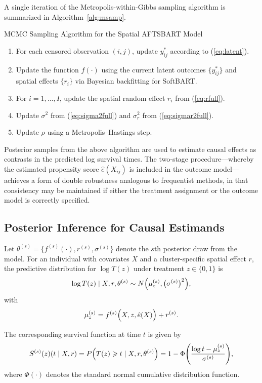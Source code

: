 \documentclass[useAMS,referee]{biom}
\begin{document}
A single iteration of the Metropolis-within-Gibbs sampling algorithm is summarized in Algorithm~\ref{alg:msamp}.

\begin{algorithm}[H]
\caption{MCMC Sampling Algorithm for the Spatial AFTSBART Model}\label{alg:msamp}
\begin{enumerate}
    \item For each censored observation \((i,j)\), update \(y_{ij}^\ast\) according to (\ref{eq:latent}).
    \item Update the function \(f(\cdot)\) using the current latent outcomes \(\{y_{ij}^\ast\}\) and spatial effects \(\{r_i\}\) via Bayesian backfitting for SoftBART.
    \item For \(i=1,\ldots,I\), update the spatial random effect \(r_i\) from (\ref{eq:rfull}).
    \item Update \(\sigma^2\) from (\ref{eq:sigma2full}) and \(\sigma_r^2\) from (\ref{eq:sigmar2full}).
    \item Update \(\rho\) using a Metropolis--Hastings step.
\end{enumerate}
\end{algorithm}

Posterior samples from the above algorithm are used to estimate causal effects as contrasts in the predicted log survival times. The two-stage procedure—whereby the estimated propensity score \(\hat{e}(X_{ij})\) is included in the outcome model—achieves a form of double robustness analogous to frequentist methods, in that consistency may be maintained if either the treatment assignment or the outcome model is correctly specified.

\subsection{Posterior Inference for Causal Estimands}

Let \(\theta^{(s)} = \{f^{(s)}(\cdot), r^{(s)}, \sigma^{(s)}\}\) denote the \(s\)th posterior draw from the model. For an individual with covariates \(X\) and a cluster-specific spatial effect \(r\), the predictive distribution for \(\log T(z)\) under treatment \(z \in \{0,1\}\) is
\[
\log T(z) \mid X, r, \theta^{(s)} \sim N\Bigl(\mu_z^{(s)}, \bigl(\sigma^{(s)}\bigr)^2\Bigr),
\]
with
\[
\mu_z^{(s)} = f^{(s)}\Bigl(X, z, \hat{e}(X)\Bigr) + r^{(s)}.
\]

The corresponding survival function at time \(t\) is given by
\[
S^{(s)}(z)(t\mid X,r) = P\Bigl(T(z) \ge t \mid X,r,\theta^{(s)}\Bigr) = 1 - \Phi\Biggl(\frac{\log t - \mu_z^{(s)}}{\sigma^{(s)}}\Biggr),
\]
where \(\Phi(\cdot)\) denotes the standard normal cumulative distribution function.
\end{document}

